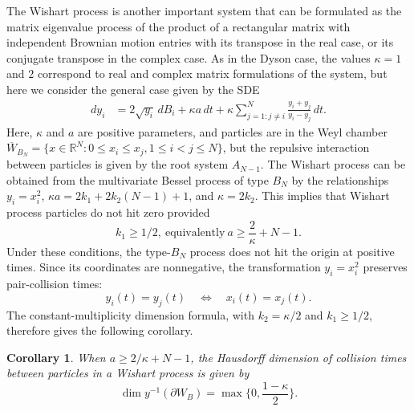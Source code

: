 \documentclass{article}
\numberwithin{equation}{section}
\newcommand{\R}{\mathbb{R}}
\newcommand{\C}{W}
\newcommand{\Cc}{\overline{W}}
\newcommand{\Cb}{\partial \C}
\theoremstyle{plain}
\newtheorem{corollary}[theorem]{Corollary}
\begin{document}
    The Wishart process \cite{Bru91,KonigOConnell01}  is another important system that can be formulated as the matrix eigenvalue process of the product of a rectangular matrix with independent Brownian motion entries with its transpose in the real case, or its conjugate transpose in the complex case. As in the Dyson case, the values $\kappa=1$ and $2$ correspond to real and complex matrix formulations of the system, but here we consider the general case given by the SDE
    \begin{align*}
        dy_i&=2\sqrt{y_i}\,dB_i+\kappa a\,dt+\kappa\sum_{j=1:j\neq i}^N\frac{y_i+y_j}{y_i-y_j}\,dt.
    \end{align*}
    Here, $\kappa$ and $a$ are positive parameters, and particles are in the Weyl chamber $\Cc_{B_N}=\{x\in\R^N:0\leq x_i\leq x_j, 1\leq i<j\leq N\}$, but the repulsive interaction between particles is given by the root system $A_{N-1}$.
    The Wishart process can be obtained from the multivariate Bessel process of type $B_N$ by the relationships $y_i=x_i^2$, $\kappa a=2k_1+2k_2(N-1)+1$, and $\kappa=2k_2$.
    This implies that Wishart process particles do not hit zero provided
    \[k_1\geq1/2,\ \text{equivalently}\ a\geq\frac2\kappa+N-1.\]
    Under these conditions, the type-$B_N$ process does not hit the origin at positive times. Since its coordinates are nonnegative, the transformation $y_i=x_i^2$ preserves pair-collision times:
    \[
        y_i(t)=y_j(t)\quad\Longleftrightarrow\quad x_i(t)=x_j(t).
    \]
    The constant-multiplicity dimension formula, with $k_2=\kappa/2$ and $k_1\geq1/2$, therefore gives the following corollary.
    \begin{corollary}
        When $a\geq 2/\kappa +N-1$, the Hausdorff dimension of collision times between particles in a Wishart process is given by
        \[\dim y^{-1}(\Cb_B)=\max\Big\{0,\frac{1-\kappa}{2}\Big\}.\]
    \end{corollary}
    
\end{document}
